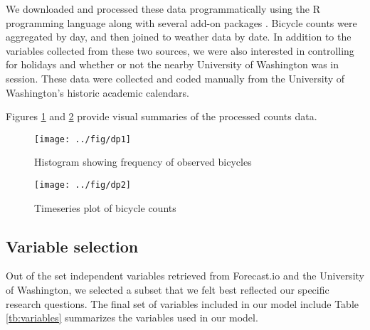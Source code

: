 \documentclass[12pt,letterpaper,article]{memoir} %
\begin{document}
We downloaded and processed these data programmatically using the R
programming language along with several add-on
packages \parencite{Grolemund:2011aa,Wickham:2011aa,Couture-Beil:2014aa,Lang:2014aa,R-Core-Team:2014aa}.
Bicycle counts were aggregated by day, and then joined to weather data
by date. In addition to the variables collected from these two
sources, we were also interested in controlling for holidays and
whether or not the nearby University of Washington was in session.
These data were collected and coded manually from the University of
Washington's historic academic calendars.

Figures \ref{fg:hist} and \ref{fg:timeseries} provide visual summaries
of the processed counts data.

\begin{figure}[h!]
  \centering
  \texttt{[image: ../fig/dp1]}
  \caption{Histogram showing frequency of observed bicycles}
  \label{fg:hist}
\end{figure}

\begin{figure}[h!]
  \centering
  \texttt{[image: ../fig/dp2]}
  \caption{Timeseries plot of bicycle counts}
  \label{fg:timeseries}
\end{figure}


\subsection*{Variable selection}
% 
% 

Out of the set independent variables retrieved from Forecast.io and
the University of Washington, we selected a subset that we felt best
reflected our specific research questions. The final set of variables
included in our model include Table \ref{tb:variables} summarizes the
variables used in our model.
\end{document}
